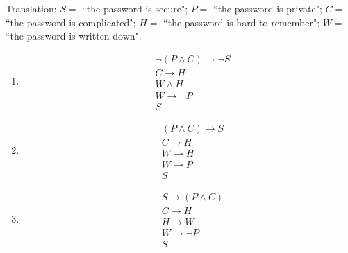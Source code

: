 \documentclass[12pt, oneside]{article}
\begin{document}
\begin{enumerate}
\begin{enumerate}
    Translation: $S =$ ``the password is secure"; $P = $ ``the password is private"; 
    $C = $  ``the password is  complicated"; $H = $ ``the password is hard to remember";
    $W =  $ ``the password is written down".
    
    \begin{enumerate}
        \item \begin{align*} &\neg (P \wedge C) \to \neg  S  \\ & C \to H  \\ & W \wedge H \\ & W \to  \neg P \\ & S \end{align*}
        \item \begin{align*} &(P \wedge  C)  \to S  \\ &  C \to H\\ & W  \to  H \\  & W \to P \\ & S\end{align*}
        \item \begin{align*} & S  \to (P \wedge C)  \\ &  C \to H\\ & H  \to  W \\  & W \to \neg P \\ & S\end{align*}
    \end{enumerate}

\end{enumerate} \end{enumerate}
\end{document}
